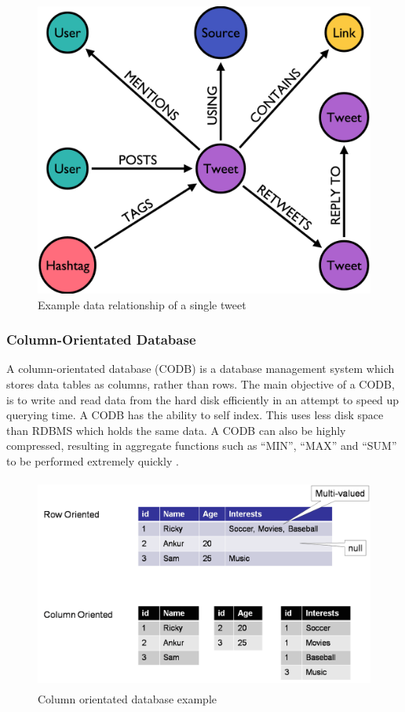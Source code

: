 \begin{figure}[H]\begin{center}\includegraphics[width=0.5\linewidth]{images/graphdb_twitter}\caption{Example data relationship of a single tweet}\label{fig:twitter}\end{center}\end{figure}

\subsubsection{Column-Orientated Database}
A column-orientated database (CODB) is a database management system which stores data tables as columns, rather than rows. The main objective of a CODB, is to write and read data from the hard disk efficiently in an attempt to speed up querying time. A CODB has the ability to self index. This uses less disk space than RDBMS which holds the same data. A CODB can also be highly compressed, resulting in aggregate functions such as ``MIN'', ``MAX'' and ``SUM'' to be performed extremely quickly \cite{cd}.

\begin{figure}[H]\begin{center}\includegraphics[height=7cm,width=0.75\linewidth]{images/codb}\caption{Column orientated database example}\label{fig:cod}\end{center}\end{figure}

